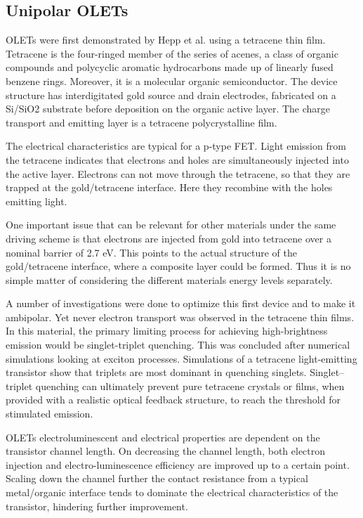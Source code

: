 \subsection{Unipolar OLETs} %

OLETs were first demonstrated by Hepp et al. using a tetracene thin film. Tetracene is the four-ringed member of the series of acenes, a class of organic compounds and polycyclic aromatic hydrocarbons made up of linearly fused benzene rings. Moreover, it is a molecular organic semiconductor. The device structure has interdigitated gold source and drain electrodes, fabricated on a Si/SiO2 substrate before deposition on the organic active layer. The charge transport and emitting layer is a tetracene polycrystalline film.

The electrical characteristics are typical for a p-type FET. Light emission from the tetracene indicates that electrons and holes are simultaneously injected into the active layer. Electrons can not move through the tetracene, so that they are trapped at the gold/tetracene interface. Here they recombine with the holes emitting light. 

One important issue that can be relevant for other materials under the same driving scheme is that electrons are injected from gold into tetracene over a nominal barrier of 2.7 eV. This points to the actual structure of the gold/tetracene interface, where a composite layer could be formed. Thus it is no simple matter of considering the different materials energy levels separately. 

A number of investigations were done to optimize this first device and to make it ambipolar. Yet never electron transport was observed in the tetracene thin films. In this material, the primary limiting process for achieving high-brightness emission would be singlet-triplet quenching. This was concluded after numerical simulations looking at exciton processes. Simulations of a tetracene light-emitting transistor show that triplets are most dominant in quenching singlets. Singlet–triplet quenching can ultimately prevent pure tetracene crystals or films, when provided with a realistic optical feedback structure, to reach the threshold for stimulated emission.

OLETs electroluminescent and electrical properties are dependent on the transistor channel length. On decreasing the channel length, both electron injection and electro-luminescence efficiency are improved up to a certain point. Scaling down the channel further the contact resistance from a typical metal/organic interface tends to dominate the electrical characteristics of the transistor, hindering further improvement.

